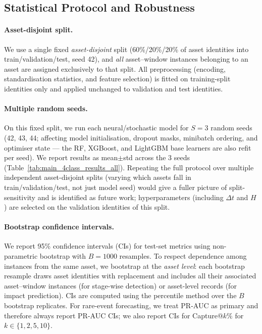 \documentclass[pdflatex,sn-mathphys-num]{sn-jnl}
\theoremstyle{thmstyleone}%
\theoremstyle{thmstyletwo}%
\theoremstyle{thmstylethree}%
\begin{document}
\subsection{Statistical Protocol and Robustness}
\label{subsec:stats_protocol}

\paragraph{Asset-disjoint split.}
We use a single fixed \emph{asset-disjoint} split (60\%/20\%/20\% of asset identities into train/validation/test, seed 42), and \emph{all} asset--window instances belonging to an asset are assigned exclusively to that split.
All preprocessing (encoding, standardisation statistics, and feature selection) is fitted on training-split identities only and applied unchanged to validation and test identities.

\paragraph{Multiple random seeds.}
On this fixed split, we run each neural/stochastic model for $S{=}3$ random seeds (42, 43, 44; affecting model initialisation, dropout masks, minibatch ordering, and optimiser state — the RF, XGBoost, and LightGBM base learners are also refit per seed).
We report results as mean$\pm$std across the 3 seeds (Table~\ref{tab:main_4class_results_all}).
Repeating the full protocol over multiple independent asset-disjoint splits (varying which assets fall in train/validation/test, not just model seed) would give a fuller picture of split-sensitivity and is identified as future work; hyperparameters (including $\Delta t$ and $H$) are selected on the validation identities of this split.

\paragraph{Bootstrap confidence intervals.}
We report 95\% confidence intervals (CIs) for test-set metrics using non-parametric bootstrap with $B{=}1000$ resamples.
To respect dependence among instances from the same asset, we bootstrap at the \emph{asset level}: each bootstrap resample draws asset identities with replacement and includes all their associated asset–window instances (for stage-wise detection) or asset-level records (for impact prediction).
CIs are computed using the percentile method over the $B$ bootstrap replicates.
For rare-event forecasting, we treat PR-AUC as primary and therefore always report PR-AUC CIs; we also report CIs for Capture@$k\%$ for $k\in\{1,2,5,10\}$.
\end{document}
